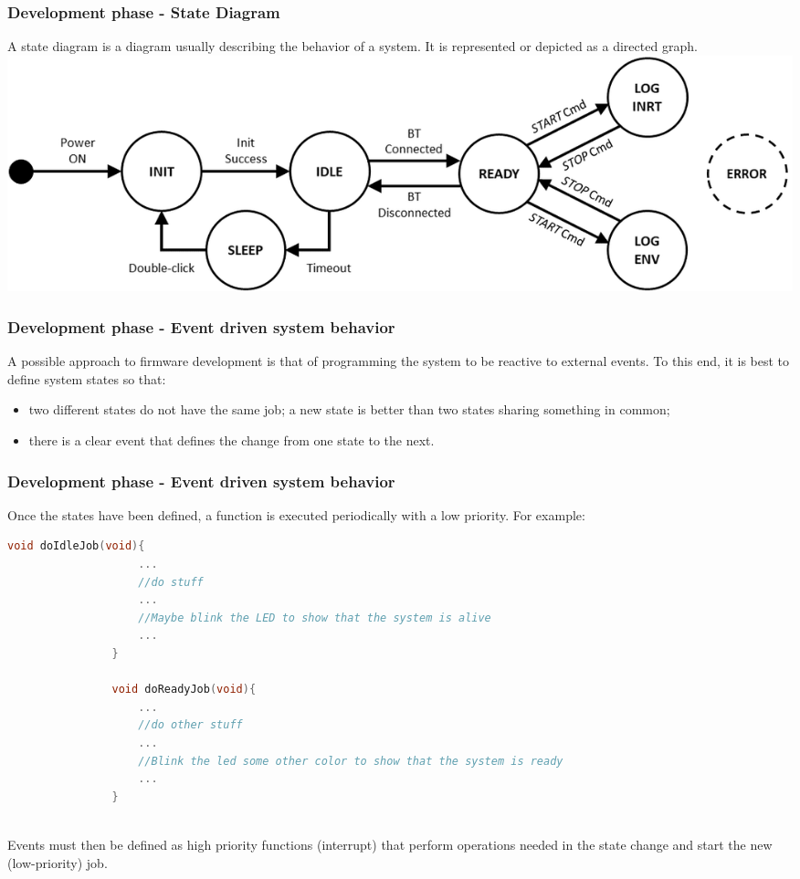 \documentclass[11pt,xcolor=table,aspectratio=169]{beamer}
\begin{document}
	\begin{frame}
		\frametitle{Development phase - State Diagram}
		A state diagram is a diagram usually describing the behavior of a system. It is represented or depicted as a directed graph.\\\vspace{.3cm}
		\centering\includegraphics[width=.8\textwidth]{media/state_diagram.png}
	\end{frame}

	\begin{frame}
		\frametitle{Development phase - Event driven system behavior}
		A possible approach to firmware development is that of programming the system to be reactive to external events. To this end, it is best to define system states so that:
		\begin{itemize}
			\item two different states do not have the same job; a new state is better than two states sharing something in common;
			\item there is a clear event that defines the change from one state to the next.
		\end{itemize}
		
	\end{frame}

	\begin{frame}[fragile]
		\frametitle{Development phase - Event driven system behavior}
		Once the states have been defined, a function is executed periodically with a low priority. For example:\\
		\hspace{-3cm}\begin{adjustbox}{max width=.9\textwidth}
			\begin{lstlisting}[language=C]
				void doIdleJob(void){
					...
					//do stuff
					...
					//Maybe blink the LED to show that the system is alive
					...
				}
			
				void doReadyJob(void){
					...
					//do other stuff
					...
					//Blink the led some other color to show that the system is ready
					...
				}
			\end{lstlisting}
		\end{adjustbox}\\
		Events must then be defined as high priority functions (interrupt) that perform operations needed in the state change and start the new (low-priority) job.	
	\end{frame}
\end{document}

